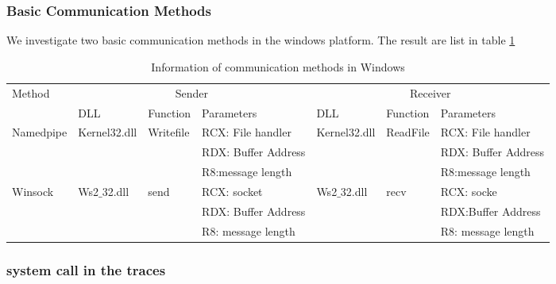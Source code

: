 \documentclass[paper=a4, fontsize=11pt]{scrartcl}
\numberwithin{equation}{section}		%
\numberwithin{figure}{section}			%
\numberwithin{table}{section}				%
\begin{document}
\subsubsection{Basic Communication Methods}
We investigate two basic communication methods in the windows platform. The result are list in table \ref{communicatemethod}
\begin{table}
        \centering
        \caption{Information of communication methods in Windows}
        \label{communicatemethod}
        \begin{tabular}{|l|l|l|l|l|l|l|}
            \hline
             \multirow{2}{*}{Method} &
               \multicolumn{3}{c|}{Sender} &
               \multicolumn{3}{c|}{Receiver} \\
             \cline{2-7}
             &  DLL & Function& Parameters & DLL  & Function & Parameters\\
             \hline
             Namedpipe& Kernel32.dll& Writefile&  RCX: File handler & Kernel32.dll & ReadFile &  RCX: File handler\\
             \cline{4-4} \cline{7-7}
             &&&RDX: Buffer Address&&&RDX: Buffer Address\\
              \cline{4-4} \cline{7-7}
               &&&R8:message length&&&R8:message length\\
               \hline
             Winsock & Ws2$\_$32.dll & send & RCX: socket & Ws2$\_$32.dll & recv & RCX: socke \\
              \cline{4-4} \cline{7-7}
             &&&RDX: Buffer Address&&&RDX:Buffer Address\\
              \cline{4-4} \cline{7-7}
               &&&R8: message length&&&R8: message length\\
            \hline
        \end{tabular}
    \end{table}

\subsubsection{system call in the traces}
\end{document}
